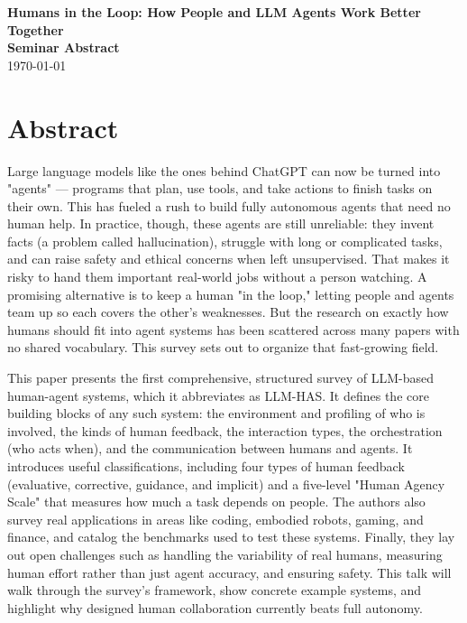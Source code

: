 \documentclass[12pt]{article}
\newcommand{\seminardate}{\today}
\begin{document}
\begin{center}
  {\LARGE\bfseries Humans in the Loop: How People and LLM Agents Work Better Together}\\[8pt]
  {\large\bfseries Seminar Abstract}\\[6pt]
  {\normalsize \seminardate}
\end{center}
\vspace{1.5em}

\section*{Abstract}
Large language models like the ones behind ChatGPT can now be turned into "agents" — programs that plan, use tools, and take actions to finish tasks on their own. This has fueled a rush to build fully autonomous agents that need no human help. In practice, though, these agents are still unreliable: they invent facts (a problem called hallucination), struggle with long or complicated tasks, and can raise safety and ethical concerns when left unsupervised. That makes it risky to hand them important real-world jobs without a person watching. A promising alternative is to keep a human "in the loop," letting people and agents team up so each covers the other's weaknesses. But the research on exactly how humans should fit into agent systems has been scattered across many papers with no shared vocabulary. This survey sets out to organize that fast-growing field.

This paper presents the first comprehensive, structured survey of LLM-based human-agent systems, which it abbreviates as LLM-HAS. It defines the core building blocks of any such system: the environment and profiling of who is involved, the kinds of human feedback, the interaction types, the orchestration (who acts when), and the communication between humans and agents. It introduces useful classifications, including four types of human feedback (evaluative, corrective, guidance, and implicit) and a five-level "Human Agency Scale" that measures how much a task depends on people. The authors also survey real applications in areas like coding, embodied robots, gaming, and finance, and catalog the benchmarks used to test these systems. Finally, they lay out open challenges such as handling the variability of real humans, measuring human effort rather than just agent accuracy, and ensuring safety. This talk will walk through the survey's framework, show concrete example systems, and highlight why designed human collaboration currently beats full autonomy.
\end{document}
